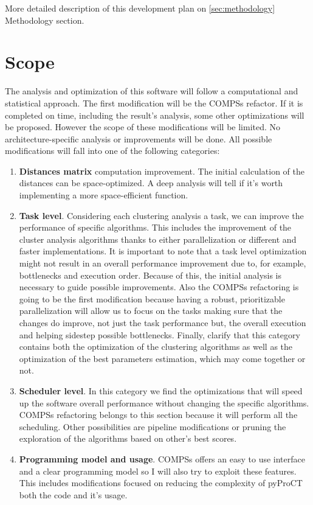 More detailed description of this development plan on \ref{sec:methodology} Methodology section.

\section{Scope}
The analysis and optimization of this software will follow a computational and statistical approach. The first modification will be the COMPSs refactor. If it is completed on time, including the result's analysis, some other optimizations will be proposed. However the scope of these modifications will be limited. No architecture-specific analysis or improvements will be done. All possible modifications will fall into one of the following categories: 
\begin{enumerate}
\item \textbf{Distances matrix} computation improvement. The initial calculation of the distances can be space-optimized. A deep analysis will tell if it's worth implementing a more space-efficient function.
\item \textbf{Task level}. Considering each clustering analysis a task, we can improve the performance of specific algorithms. This includes the improvement of the cluster analysis algorithms thanks to either parallelization or different and faster implementations. It is important to note that a task level optimization might not result in an overall performance improvement due to, for example, bottlenecks and execution order. Because of this, the initial analysis is necessary to guide possible improvements. Also the COMPSs refactoring is going to be the first modification because having a robust, prioritizable parallelization will allow us to focus on the tasks making sure that the changes do improve, not just the task performance but, the overall execution and helping sidestep possible bottlenecks. Finally, clarify that this category contains both the optimization of the clustering algorithms as well as the optimization of the best parameters estimation, which may come together or not.
\item \textbf{Scheduler level}. In this category we find the optimizations that will speed up the software overall performance without changing the specific algorithms. COMPSs refactoring belongs to this section because it will perform all the scheduling. Other possibilities are pipeline modifications or pruning the exploration of the algorithms based on other's best scores.
\item \textbf{Programming model and usage}. COMPSs offers an easy to use interface and a clear programming model so I will also try to exploit these features. This includes modifications focused on reducing the complexity of pyProCT both the code and it's usage.
\end{enumerate}



